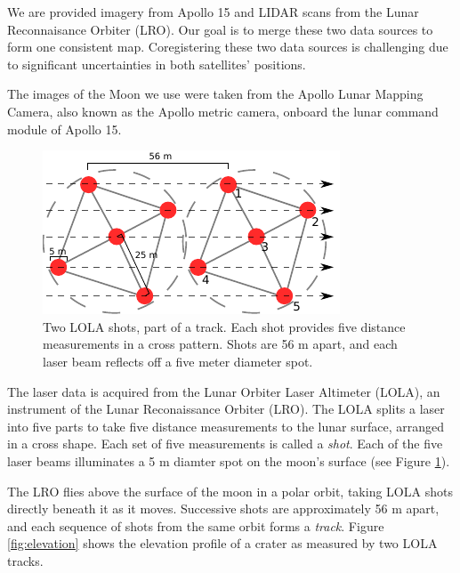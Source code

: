 
We are provided imagery from Apollo 15 and LIDAR scans from the Lunar Reconnaisance
Orbiter (LRO). Our goal is to merge these two data sources to form one consistent map.
Coregistering these two data sources is challenging due to significant uncertainties
in both satellites' positions.

The images of the Moon we use were taken from the Apollo Lunar Mapping Camera, also
known as the Apollo metric camera, onboard the lunar command module of Apollo 15. 

\begin{figure}
	\centering
	\includegraphics[width=0.8 \columnwidth]{lidar2img/fig/lola_shots.pdf}
	\caption{Two LOLA shots, part of a track. Each shot provides five
		distance measurements in a cross pattern. Shots are 56 m
		apart, and each laser beam reflects off a five meter diameter spot.}
	\label{fig:lolashots}
\end{figure}

The laser data is acquired from the Lunar Orbiter Laser Altimeter (LOLA), an instrument of the
Lunar Reconaissance Orbiter (LRO). The LOLA splits a laser into five parts to take five distance
measurements to the lunar surface, arranged in a cross shape. Each set of five measurements
is called a \emph{shot}. Each of the five laser beams
illuminates a 5 m diamter spot on the moon's surface (see Figure \ref{fig:lolashots}).

The LRO flies above the surface of the moon in a polar orbit, taking LOLA shots directly beneath
it as it moves.
Successive shots are approximately 56 m apart, and each sequence of shots from the same
orbit forms a \emph{track}. Figure \ref{fig:elevation} shows the elevation profile
of a crater as measured by two LOLA tracks.


